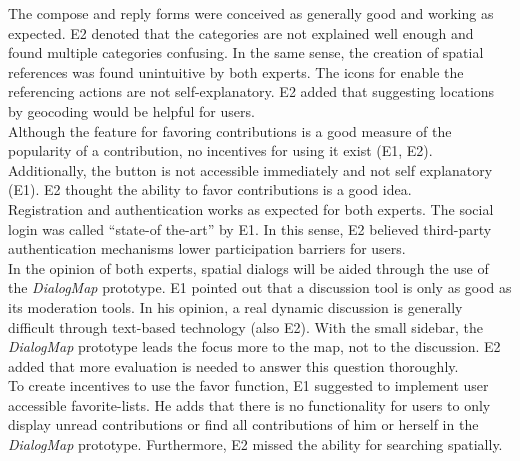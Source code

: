 The compose and reply forms were conceived as generally good and working as expected. E2 denoted that the categories are not explained well enough and found multiple categories confusing. In the same sense, the creation of spatial references was found unintuitive by both experts. The icons for enable the referencing actions are not self-explanatory. E2 added that suggesting locations by geocoding would be helpful for users.\\
Although the feature for favoring contributions is a good measure of the popularity of a contribution, no incentives for using it exist (E1, E2). Additionally, the button is not accessible immediately and not self explanatory (E1). E2 thought the ability to favor contributions is a good idea.\\
Registration and authentication works as expected for both experts. The social login was called ``state-of the-art'' by E1. In this sense, E2 believed third-party authentication mechanisms lower participation barriers for users.\\
In the opinion of both experts, spatial dialogs will be aided through the use of the \textit{DialogMap} prototype. E1 pointed out that a discussion tool is only as good as its moderation tools. In his opinion, a real dynamic discussion is generally difficult through text-based technology (also E2). With the small sidebar, the \textit{DialogMap} prototype leads the focus more to the map, not to the discussion. E2 added that more evaluation is needed to answer this question thoroughly.\\
To create incentives to use the favor function, E1 suggested to implement user accessible favorite-lists. He adds that there is no functionality for users to only display unread contributions or find all contributions of him or herself in the \textit{DialogMap} prototype. Furthermore, E2 missed the ability for searching spatially.\\

